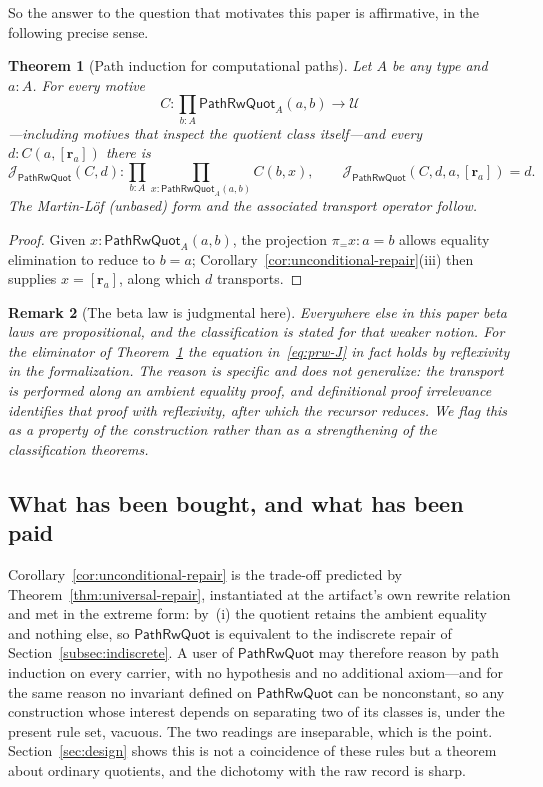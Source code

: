 \documentclass[10pt,reqno]{amsart}
\newtheorem{theorem}{Theorem}[section]
\newtheorem{remark}[theorem]{Remark}
\newcommand{\U}{\mathcal U}
\newcommand{\PRW}{\mathsf{PathRwQuot}}
\begin{document}
So the answer to the question that motivates this paper is affirmative, in the
following precise sense.

\begin{theorem}[Path induction for computational paths]
\label{thm:quotient-path-induction}
Let \(A\) be any type and \(a:A\).  For every motive
\[
        C:\prod_{b:A}\PRW_A(a,b)\longrightarrow\U
\]
---including motives that inspect the quotient class itself---and every
\(d:C(a,[\mathbf r_a])\) there is
\[
 \mathcal J_{\PRW}(C,d):\prod_{b:A}\prod_{x:\PRW_A(a,b)}C(b,x),
 \qquad
 \mathcal J_{\PRW}(C,d,a,[\mathbf r_a])=d .
\tag{11.6}\label{eq:prw-J}
\]
The Martin-L\"of (unbased) form and the associated transport operator follow.
\end{theorem}

\begin{proof}
Given \(x:\PRW_A(a,b)\), the projection \(\pi_{=}x:a=b\) allows equality
elimination to reduce to \(b=a\); Corollary~\ref{cor:unconditional-repair}(iii)
then supplies \(x=[\mathbf r_a]\), along which \(d\) transports.
\end{proof}

\begin{remark}[The beta law is judgmental here]
\label{rem:judgmental-beta}
Everywhere else in this paper beta laws are propositional, and the
classification is stated for that weaker notion.  For the eliminator of
Theorem~\ref{thm:quotient-path-induction} the equation in~\eqref{eq:prw-J} in
fact holds by reflexivity in the formalization.  The reason is specific and does
not generalize: the transport is performed along an \emph{ambient equality
proof}, and definitional proof irrelevance identifies that proof with
reflexivity, after which the recursor reduces.  We flag this as a property of
the construction rather than as a strengthening of the classification theorems.
\end{remark}

\subsection{What has been bought, and what has been paid}

Corollary~\ref{cor:unconditional-repair} is the trade-off predicted by
Theorem~\ref{thm:universal-repair}, instantiated at the artifact's own rewrite
relation and met in the extreme form: by~(i) the quotient retains the ambient
equality and nothing else, so \(\PRW\) is equivalent to the indiscrete repair of
Section~\ref{subsec:indiscrete}.  A user of \(\PRW\) may therefore reason by
path induction on every carrier, with no hypothesis and no additional axiom---and
for the same reason no invariant defined on \(\PRW\) can be nonconstant, so any
construction whose interest depends on separating two of its classes is, under
the present rule set, vacuous.  The two readings are inseparable, which is the
point.  Section~\ref{sec:design} shows this is not a coincidence of these rules
but a theorem about ordinary quotients, and the dichotomy with the raw record is
sharp.
\end{document}
